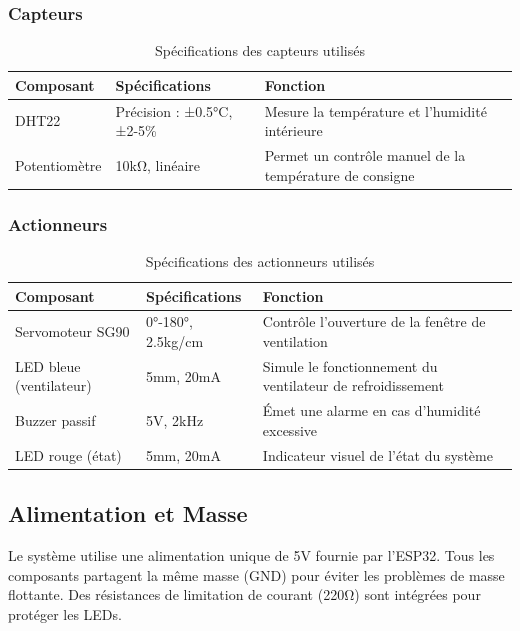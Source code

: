 \documentclass[12pt,a4paper]{article}
\begin{document}
\subsubsection{Capteurs}
\begin{table}[h]
    \centering
    \begin{tabular}{|p{4cm}|p{3cm}|p{8cm}|}
        \hline
        \textbf{Composant} & \textbf{Spécifications} & \textbf{Fonction} \\
        \hline
        DHT22 & Précision : ±0.5°C, ±2-5\% & Mesure la température et l'humidité intérieure \\
        \hline
        Potentiomètre & 10kΩ, linéaire & Permet un contrôle manuel de la température de consigne \\
        \hline
    \end{tabular}
    \caption{Spécifications des capteurs utilisés}
    \label{tab:capteurs}
\end{table}

\subsubsection{Actionneurs}
\begin{table}[h]
    \centering
    \begin{tabular}{|p{4cm}|p{3cm}|p{8cm}|}
        \hline
        \textbf{Composant} & \textbf{Spécifications} & \textbf{Fonction} \\
        \hline
        Servomoteur SG90 & 0°-180°, 2.5kg/cm & Contrôle l'ouverture de la fenêtre de ventilation \\
        \hline
        LED bleue (ventilateur) & 5mm, 20mA & Simule le fonctionnement du ventilateur de refroidissement \\
        \hline
        Buzzer passif & 5V, 2kHz & Émet une alarme en cas d'humidité excessive \\
        \hline
        LED rouge (état) & 5mm, 20mA & Indicateur visuel de l'état du système \\
        \hline
    \end{tabular}
    \caption{Spécifications des actionneurs utilisés}
    \label{tab:actionneurs}
\end{table}

\subsection{Alimentation et Masse}
Le système utilise une alimentation unique de 5V fournie par l'ESP32. Tous les composants partagent la même masse (GND) pour éviter les problèmes de masse flottante. Des résistances de limitation de courant (220Ω) sont intégrées pour protéger les LEDs.
\end{document}
